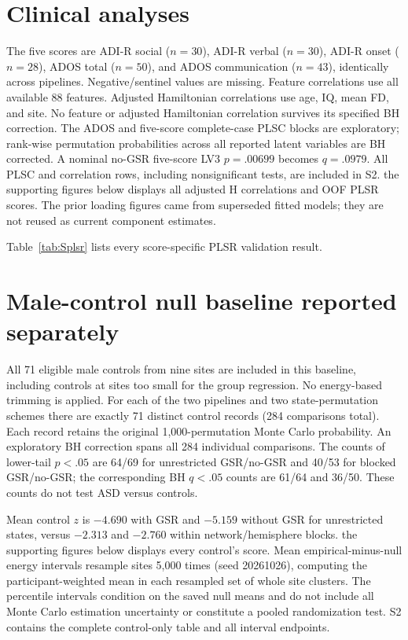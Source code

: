 \documentclass[10pt,letterpaper]{article}
\begin{document}


\section*{Clinical analyses}
The five scores are ADI-R social ($n=30$), ADI-R verbal ($n=30$), ADI-R onset
($n=28$), ADOS total ($n=50$), and ADOS communication ($n=43$), identically across
pipelines. Negative/sentinel values are missing. Feature correlations use all
available 88 features. Adjusted Hamiltonian correlations use age, IQ, mean FD,
and site. No feature or adjusted Hamiltonian correlation survives its specified
BH correction. The ADOS and five-score complete-case PLSC blocks are exploratory;
rank-wise permutation probabilities across all reported latent variables are
BH corrected. A nominal no-GSR five-score LV3 $p=.00699$ becomes $q=.0979$.
All PLSC and correlation rows, including nonsignificant tests, are included in S2.
the supporting figures below displays all adjusted H correlations and OOF PLSR scores.
The prior loading figures came from superseded fitted models; they are not
reused as current component estimates.

Table~\ref{tab:Splsr} lists every score-specific PLSR validation result.


\section*{Male-control null baseline reported separately}
All 71 eligible male controls from nine sites are included in this baseline,
including controls at sites too small for the group regression. No energy-based
trimming is applied. For each of the two pipelines and two state-permutation
schemes there are exactly 71 distinct control records (284 comparisons total).
Each record retains the original 1,000-permutation Monte Carlo probability.
An exploratory BH correction spans all 284 individual comparisons. The counts
of lower-tail $p<.05$ are 64/69 for unrestricted GSR/no-GSR and 40/53 for blocked
GSR/no-GSR; the corresponding BH $q<.05$ counts are 61/64 and 36/50.
These counts do not test ASD versus controls.

Mean control $z$ is $-4.690$ with GSR and $-5.159$ without GSR for unrestricted
states, versus $-2.313$ and $-2.760$ within network/hemisphere blocks.
the supporting figures below displays every control's score. Mean empirical-minus-null
energy intervals resample sites 5,000 times (seed 20261026), computing the
participant-weighted mean in each resampled set of whole site clusters. The
percentile intervals condition on the saved null means and do not include all
Monte Carlo estimation uncertainty or constitute a pooled randomization test.
S2 contains the complete control-only table and all interval endpoints.
\end{document}
